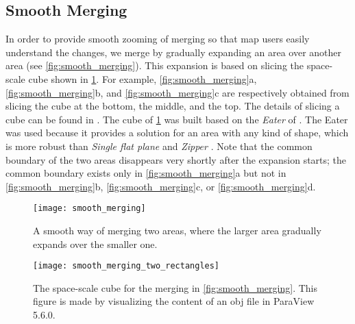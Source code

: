 \documentclass[ijgi,article,submit,moreauthors,pdftex]{Definitions/mdpi}
\begin{document}
\subsection{Smooth Merging}
\label{sec:smooth_merging}

In order to provide smooth zooming of merging
so that map users easily understand the changes,
we merge by gradually expanding an area over another area
(see \fig\ref{fig:smooth_merging}).
This expansion is based on slicing the space-scale cube shown in
\fig\ref{fig:smooth_merging_two_rectangles}.
For example, \figs\ref{fig:smooth_merging}a,
\ref{fig:smooth_merging}b, and \ref{fig:smooth_merging}c
are respectively obtained from slicing the cube 
at the bottom, the middle, and the top.
The details of slicing a cube can be found in \citet{Meijers2020Web}.
The cube of \fig\ref{fig:smooth_merging_two_rectangles} was built 
based on the \emph{Eater} of \citet{Suba2014Merge}.
The Eater was used because it provides a solution 
for an area with any kind of shape, which is more robust than
\emph{Single flat plane} and \emph{Zipper} \citep{Suba2014Merge}.
Note that the common boundary of the two areas disappears
very shortly after the expansion starts;
the common boundary exists only in \fig\ref{fig:smooth_merging}a but not in
\fig\ref{fig:smooth_merging}b,
\fig\ref{fig:smooth_merging}c, or
\fig\ref{fig:smooth_merging}d.


\begin{figure}[tb]
\centering
\texttt{[image: smooth\_merging]}
\caption{A smooth way of merging two areas,
    where the larger area gradually expands over the smaller one.}
\label{fig:smooth_merging}
%
\vspace{6mm}
%
\centering
\texttt{[image: smooth\_merging\_two\_rectangles]}
\caption{The space-scale cube for the merging 
    in \fig\ref{fig:smooth_merging}.
    This figure is made by visualizing the content of an obj file in 
    ParaView 5.6.0.}
\label{fig:smooth_merging_two_rectangles}
\end{figure}



\end{document}
